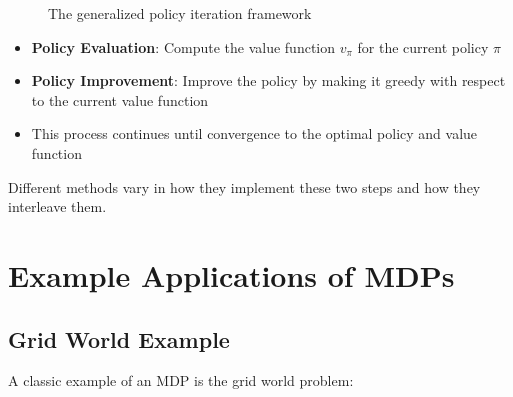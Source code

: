 \documentclass[12pt,a4paper]{article}
\begin{document}
\begin{figure}[H]
\centering
{}
\caption{The generalized policy iteration framework}
\end{figure}

\begin{itemize}
    \item \textbf{Policy Evaluation}: Compute the value function $v_\pi$ for the current policy $\pi$
    \item \textbf{Policy Improvement}: Improve the policy by making it greedy with respect to the current value function
    \item This process continues until convergence to the optimal policy and value function
\end{itemize}

Different methods vary in how they implement these two steps and how they interleave them.

\section{Example Applications of MDPs}

\subsection{Grid World Example}

A classic example of an MDP is the grid world problem:
\end{document}
